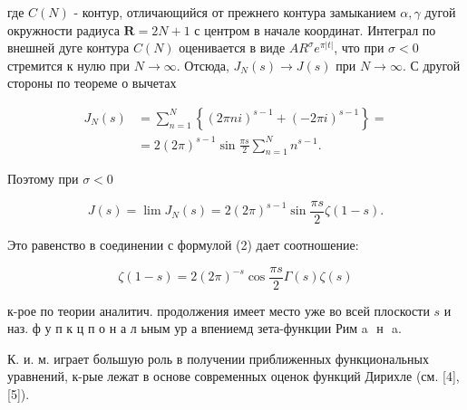 \documentclass[10pt]{article}
\begin{document}
где $C(N)$ - контур, отличающийся от прежнего контура замыканием $\alpha, \gamma$ дугой окружности радиуса $\boldsymbol{R}=2 N+1$ с центром в начале координат. Интеграл по внешней дуге контура $C(N)$ оценивается в виде $A R^{\sigma} e^{\pi|t|}$, что при $\sigma<0$ стремится к нулю при $N \rightarrow \infty$. Отсюда, $J_{N}(s) \rightarrow J(s)$ при $N \rightarrow \infty$. С другой стороны по теореме о вычетах



\[

\begin{aligned}

J_{N}(s) & =\sum_{n=1}^{N}\left\{(2 \pi n i)^{s-1}+(-2 \pi i)^{s-1}\right\}= \\

& =2(2 \pi)^{s-1} \sin \frac{\pi s}{2} \sum_{n=1}^{N} n^{s-1} .

\end{aligned}

\]



Поэтому при $\sigma<0$



\[

J(s)=\lim J_{N}(s)=2(2 \pi)^{s-1} \sin \frac{\pi s}{2} \zeta(1-s) .

\]



Это равенство в соединении с формулой (2) дает соотношение:



\[

\zeta(1-s)=2(2 \pi)^{-s} \cos \frac{\pi s}{2} \Gamma(s) \zeta(s)

\]



к-рое по теории аналитич. продолжения имеет место уже во всей плоскости $s$ и наз. ф у п к ц п о н а л ьным ур а впениемд зета-функции Рим a $\boldsymbol{\text { н }}$ a.



К. и. м. играет большую роль в получении приближенных функциональных уравнений, к-рые лежат в основе современных оценок функций Дирихле (см. [4], [5]).
\end{document}
